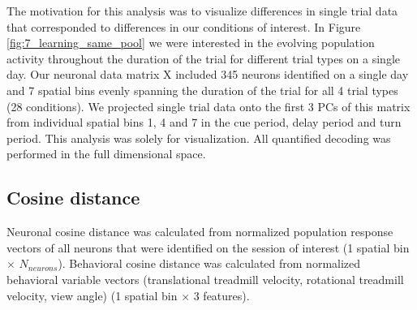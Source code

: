 \bigskip

The motivation for this analysis was to visualize differences in single trial data that corresponded to differences in our conditions of interest. In Figure \ref{fig:7_learning_same_pool} we were interested in the evolving population activity throughout the duration of the trial for different trial types on a single day. Our neuronal data matrix X included 345 neurons identified on a single day and 7 spatial bins evenly spanning the duration of the trial for all 4 trial types (28 conditions). We projected single trial data onto the first 3 PCs of this matrix from individual spatial bins 1, 4 and 7 in the cue period, delay period and turn period. This analysis was solely for visualization. All quantified decoding was performed in the full dimensional space. 

\subsection{Cosine distance}
Neuronal cosine distance was calculated from normalized population response vectors of all neurons that were identified on the session of interest (1 spatial bin $\times$ $N_{neurons}$). Behavioral cosine distance was calculated from normalized behavioral variable vectors (translational treadmill velocity, rotational treadmill velocity, view angle) (1 spatial bin $\times$ 3 features). 
